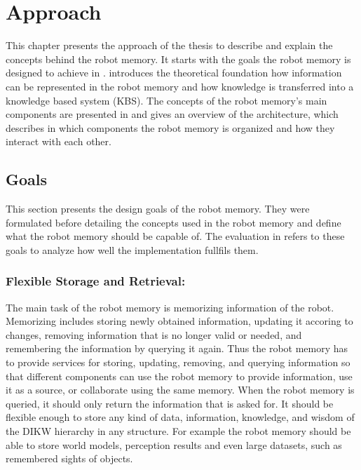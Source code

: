 \chapter{Approach}
\label{chap:approach}
This chapter presents the approach of the thesis to describe and
explain the concepts behind the robot memory. It starts with the
goals the robot memory is designed to achieve in
.  introduces the theoretical
foundation how information can be represented in the robot memory and
how knowledge is transferred into a knowledge based system (KBS). The
concepts of the robot memory's main components are presented in
 and  gives an overview
of the architecture, which describes in which components the robot
memory is organized and how they interact with each other.

\section{Goals}
\label{sec:goals}
This section presents the design goals of the robot memory. They were
formulated before detailing the concepts used in the robot memory and
define what the robot memory should be capable of. The evaluation in
 refers to these goals to analyze how well
the implementation fullfils them.

\subsection{Flexible Storage and Retrieval:} The main task of
the robot memory is memorizing information of the robot. Memorizing
includes storing newly obtained information, updating it accoring to
changes, removing information that is no longer valid or needed, and
remembering the information by querying it again. Thus the robot
memory has to provide services for storing, updating, removing, and
querying information so that different components can use the robot
memory to provide information, use it as a source, or collaborate
using the same memory.  When the robot memory is queried, it should
only return the information that is asked for. It should be flexible
enough to store any kind of data, information, knowledge, and wisdom
of the DIKW hierarchy in any structure. For example the robot memory
should be able to store world models, perception results and even
large datasets, such as remembered sights of objects.

